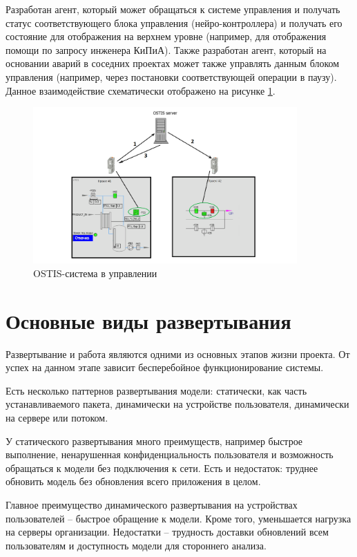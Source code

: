Разработан агент, который может обращаться к системе управления и получать статус соответствующего блока управления (нейро-контроллера) и получать его состояние для отображения на верхнем уровне (например, для отображения помощи по запросу инженера КиПиА). Также разработан агент, который на основании аварий в соседних проектах может также управлять данным блоком управления (например, через постановки соответствующей операции в паузу). Данное взаимодействие схематически отображено на рисунке \ref{fig:OSTIS_in_control}.

\begin{figure}[H]
    \centering
    \includegraphics[width=0.9\textwidth]{images/chapter_4/OSTIS_in_control.png}
    \caption{OSTIS-система в управлении}
    \label{fig:OSTIS_in_control}
\end{figure}

\section{Основные виды развертывания}

Развертывание и работа являются одними из основных этапов жизни проекта. От успех на данном этапе зависит бесперебойное функционирование системы.

Есть несколько паттернов развертывания модели: статически, как часть устанавливаемого пакета, динамически на устройстве пользователя, динамически на сервере или потоком.

У статического развертывания много преимуществ, например быстрое выполнение, ненарушенная конфиденциальность пользователя и возможность обращаться к модели без подключения к сети. Есть и недостаток: труднее обновить модель без обновления всего приложения в целом.

Главное преимущество динамического развертывания на устройствах пользователей {--} быстрое обращение к модели. Кроме того, уменьшается нагрузка на серверы организации. Недостатки – трудность доставки обновлений всем пользователям и доступность модели для стороннего анализа.

